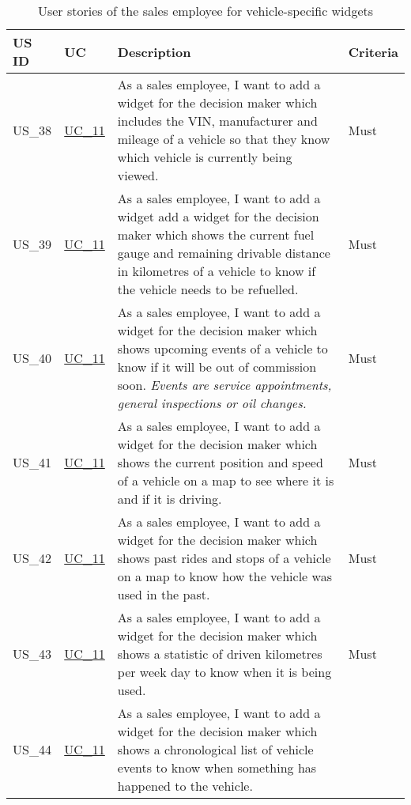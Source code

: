   \sffamily
  \begin{footnotesize}
    \label{FahrzeugWidgets}
    \begin{longtable}[L L L]{ p{} p{} p{} p{} }
      \caption                       %
          {User stories of the sales employee for vehicle-specific widgets} %
          \\
      \toprule
      \textbf{US ID} & \textbf{UC} & \textbf{Description} & \textbf{Criteria} \\
      \midrule
      \hypertarget{Ref:US38}{US\_38} & \hyperlink{Ref:UC11}{UC\_11} & As a sales employee, I want to add a widget for the decision maker which includes the VIN, manufacturer and mileage of a vehicle so that they know which vehicle is currently being viewed. & Must \\
      \hypertarget{Ref:US39}{US\_39} & \hyperlink{Ref:UC11}{UC\_11} & As a sales employee, I want to add a widget add a widget for the decision maker which shows the current fuel gauge and remaining drivable distance in kilometres of a vehicle to know if the vehicle needs to be refuelled. & Must \\
      \hypertarget{Ref:US40}{US\_40} & \hyperlink{Ref:UC11}{UC\_11} & As a sales employee, I want to add a widget for the decision maker which shows upcoming events of a vehicle to know if it will be out of commission soon.
      \newline\newline
      \emph{Events are service appointments, general inspections or oil changes.} & Must \\
      \hypertarget{Ref:US41}{US\_41} & \hyperlink{Ref:UC11}{UC\_11} & As a sales employee, I want to add a widget for the decision maker which shows the current position and speed of a vehicle on a map to see where it is and if it is driving. & Must \\
      \hypertarget{Ref:US42}{US\_42} & \hyperlink{Ref:UC11}{UC\_11} & As a sales employee, I want to add a widget for the decision maker which shows past rides and stops of a vehicle on a map to know how the vehicle was used in the past. & Must \\
      \hypertarget{Ref:US43}{US\_43} & \hyperlink{Ref:UC11}{UC\_11} & As a sales employee, I want to add a widget for the decision maker which shows a statistic of driven kilometres per week day to know when it is being used. & Must \\
      \hypertarget{Ref:US44}{US\_44} & \hyperlink{Ref:UC11}{UC\_11} & As a sales employee, I want to add a widget for the decision maker which shows a chronological list of vehicle events to know when something has happened to the vehicle. 

\end{longtable}
\end{footnotesize}
